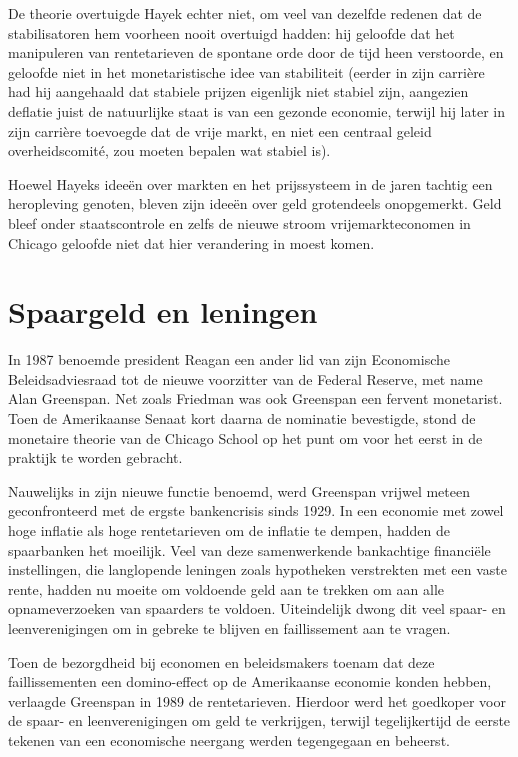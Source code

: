 \documentclass[
  a5paper,
  smalldemyvopaper,11pt,twoside,onecolumn,openright,extrafontsizes,
hidelinks]{memoir}
\begin{document}
De theorie overtuigde Hayek echter niet, om veel van dezelfde redenen
dat de stabilisatoren hem voorheen nooit overtuigd hadden: hij geloofde
dat het manipuleren van rentetarieven de spontane orde door de tijd heen
verstoorde, en geloofde niet in het monetaristische idee van stabiliteit
(eerder in zijn carrière had hij aangehaald dat stabiele prijzen
eigenlijk niet stabiel zijn, aangezien deflatie juist de natuurlijke
staat is van een gezonde economie, terwijl hij later in zijn carrière
toevoegde dat de vrije markt, en niet een centraal geleid
overheidscomité, zou moeten bepalen wat stabiel is).

Hoewel Hayeks ideeën over markten en het prijssysteem in de jaren
tachtig een heropleving genoten, bleven zijn ideeën over geld
grotendeels onopgemerkt. Geld bleef onder staatscontrole en zelfs de
nieuwe stroom vrijemarkteconomen in Chicago geloofde niet dat hier
verandering in moest komen.

\section{Spaargeld en leningen}\label{spaargeld-en-leningen}

In 1987 benoemde president Reagan een ander lid van zijn Economische
Beleidsadviesraad tot de nieuwe voorzitter van de Federal Reserve, met
name Alan Greenspan. Net zoals Friedman was ook Greenspan een fervent
monetarist. Toen de Amerikaanse Senaat kort daarna de nominatie
bevestigde, stond de monetaire theorie van de Chicago School op het punt
om voor het eerst in de praktijk te worden gebracht.

Nauwelijks in zijn nieuwe functie benoemd, werd Greenspan vrijwel meteen
geconfronteerd met de ergste bankencrisis sinds 1929. In een economie
met zowel hoge inflatie als hoge rentetarieven om de inflatie te dempen,
hadden de spaarbanken het moeilijk. Veel van deze samenwerkende
bankachtige financiële instellingen, die langlopende leningen zoals
hypotheken verstrekten met een vaste rente, hadden nu moeite om
voldoende geld aan te trekken om aan alle opnameverzoeken van spaarders
te voldoen. Uiteindelijk dwong dit veel spaar- en leenverenigingen om in
gebreke te blijven en faillissement aan te vragen.

Toen de bezorgdheid bij economen en beleidsmakers toenam dat deze
faillissementen een domino-effect op de Amerikaanse economie konden
hebben, verlaagde Greenspan in 1989 de rentetarieven. Hierdoor werd het
goedkoper voor de spaar- en leenverenigingen om geld te verkrijgen,
terwijl tegelijkertijd de eerste tekenen van een economische neergang
werden tegengegaan en beheerst.
\end{document}

